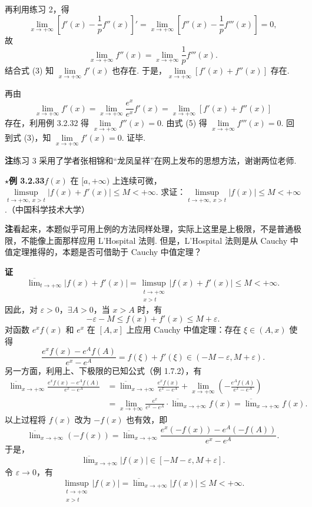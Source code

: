 \documentclass[UTF8,12pt,a4paper,fontset=fandol]{ctexart}
\begin{document}
再利用练习 2，得
\[
  \lim_{x\to+\infty}\left[f'(x)-\frac1p f''(x)\right]'
  =
  \lim_{x\to+\infty}\left[f''(x)-\frac1p f'''(x)\right]=0,
\]
故
\[
  \lim_{x\to+\infty}f''(x)=\lim_{x\to+\infty}\frac1p f'''(x).
\tag{5}
\]
结合式 (3) 知 $\lim\limits_{x\to+\infty}f'(x)$ 也存在. 于是，$\lim\limits_{x\to+\infty}[f'(x)+f''(x)]$ 存在.

再由
\[
  \lim_{x\to+\infty}f'(x)
  =
  \lim_{x\to+\infty}\frac{e^x}{e^x}f'(x)
  =
  \lim_{x\to+\infty}[f'(x)+f''(x)]
\]
存在，利用例 3.2.32 得 $\lim\limits_{x\to+\infty}f''(x)=0$. 由式 (5) 得 $\lim\limits_{x\to+\infty}f'''(x)=0$. 回到式 (3)，知 $\lim\limits_{x\to+\infty}f'(x)=0$. 证毕.

\noindent\textbf{注}\quad 练习 3 采用了学者张相锦和“龙凤呈祥”在网上发布的思想方法，谢谢两位老师.

\noindent\textbf{$\star$例 3.2.33}\quad $f(x)$ 在 $[a,+\infty)$ 上连续可微，$\limsup\limits_{t\to+\infty,\ x>t}|f(x)+f'(x)|\le M<+\infty$. 求证：$\limsup\limits_{t\to+\infty,\ x>t}|f(x)|\le M<+\infty$.（中国科学技术大学）

\noindent\textbf{注}\quad 看起来，本题似乎可用上例的方法同样处理，实际上这里是上极限，不是普通极限，不能像上面那样应用 L'Hospital 法则. 但是，L'Hospital 法则是从 Cauchy 中值定理推得的，本题是否可借助于 Cauchy 中值定理？

\noindent\textbf{证}\quad
\[
  \overline{\lim}_{t\to+\infty}|f(x)+f'(x)|
  =
  \limsup_{\substack{t\to+\infty\\ x>t}}|f(x)+f'(x)|\le M<+\infty.
\]
因此，对 $\varepsilon>0$，$\exists A>0$，当 $x>A$ 时，有
\[
  -\varepsilon-M\le f(x)+f'(x)\le M+\varepsilon.
\]
对函数 $e^xf(x)$ 和 $e^x$ 在 $[A,x]$ 上应用 Cauchy 中值定理：存在 $\xi\in(A,x)$ 使得
\[
  \frac{e^xf(x)-e^Af(A)}{e^x-e^A}
  =
  f(\xi)+f'(\xi)\in(-M-\varepsilon,M+\varepsilon).
\tag{1}
\]
另一方面，利用上、下极限的已知公式（例 1.7.2），有
\[
\begin{aligned}
  \overline{\lim}_{x\to+\infty}\frac{e^xf(x)-e^Af(A)}{e^x-e^A}
  &=
  \overline{\lim}_{x\to+\infty}\frac{e^xf(x)}{e^x-e^A}
  +\lim_{x\to+\infty}\left(-\frac{e^Af(A)}{e^x-e^A}\right) \\
  &=
  \lim_{x\to+\infty}\frac{e^x}{e^x-e^A}\cdot
  \overline{\lim}_{x\to+\infty}f(x)
  =
  \overline{\lim}_{x\to+\infty}f(x).
\end{aligned}
\tag{2}
\]
以上过程将 $f(x)$ 改为 $-f(x)$ 也有效，即
\[
  \overline{\lim}_{x\to+\infty}(-f(x))
  =
  \overline{\lim}_{x\to+\infty}
  \frac{e^x(-f(x))-e^A(-f(A))}{e^x-e^A}.
\]
于是，
\[
  \overline{\lim}_{x\to+\infty}|f(x)|\in[-M-\varepsilon,M+\varepsilon].
\]
令 $\varepsilon\to0$，有
\[
  \limsup_{\substack{t\to+\infty\\ x>t}}|f(x)|
  =
  \overline{\lim}_{x\to+\infty}|f(x)|\le M<+\infty.
\]
\end{document}
